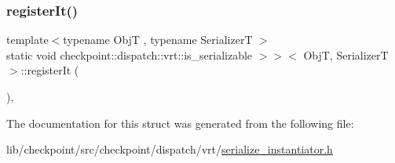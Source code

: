 \subsubsection{\texorpdfstring{register\+It()}{registerIt()}}
{\footnotesize\ttfamily template$<$typename ObjT , typename SerializerT $>$ \\
static void checkpoint\+::dispatch\+::vrt\+::is\+\_\+serializable $>$$>$$<$ ObjT, SerializerT $>$\+::register\+It (\begin{DoxyParamCaption}{ }\end{DoxyParamCaption})\hspace{0.3cm}{\ttfamily [inline]}, {\ttfamily [static]}}



The documentation for this struct was generated from the following file\+:\begin{DoxyCompactItemize}
\item 
lib/checkpoint/src/checkpoint/dispatch/vrt/\hyperlink{serialize__instantiator_8h}{serialize\+\_\+instantiator.\+h}\end{DoxyCompactItemize}
